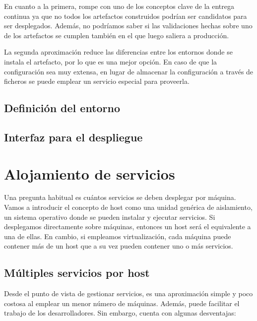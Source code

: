 \documentclass[11pt,a4paper]{article}
\begin{document}
En cuanto a la primera, rompe con uno de los conceptos clave de la entrega continua ya que no todos los artefactos construidos podrían ser candidatos para ser desplegados. Además, no podríamos saber si las validaciones hechas sobre uno de los artefactos se cumplen también en el que luego saliera a producción.

La segunda aproximación reduce las diferencias entre los entornos donde se instala el artefacto, por lo que es una mejor opción. En caso de que la configuración sea muy extensa, en lugar de almacenar la configuración a través de ficheros se puede emplear un servicio especial para proveerla.

\subsection{Definición del entorno}

\subsection{Interfaz para el despliegue}

\section{Alojamiento de servicios}

Una pregunta habitual es cuántos servicios se deben desplegar por máquina. Vamos a introducir el concepto de host como una unidad genérica de aislamiento, un sistema operativo donde se pueden instalar y ejecutar servicios. Si desplegamos directamente sobre máquinas, entonces un host será el equivalente a una de ellas. En cambio, si empleamos virtualización, cada máquina puede contener más de un host que a su vez pueden contener uno o más servicios. 

\subsection{Múltiples servicios por host}

Desde el punto de vista de gestionar servicios, es una aproximación simple y poco costosa al emplear un menor número de máquinas. Además, puede facilitar el trabajo de los desarrolladores. Sin embargo, cuenta con algunas desventajas:
\end{document}
